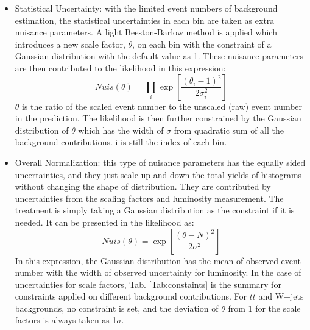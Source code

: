 \begin{itemize}
	\item Statistical Uncertainty: with the limited event numbers of background estimation, the statistical uncertainties in each bin are taken as extra nuisance parameters. A light Beeston-Barlow method is applied which introduces a new scale factor, $\theta$, on each bin with the constraint of a Gaussian distribution with the default value as 1. These nuisance parameters are then contributed to the likelihood in this expression:
	\begin{equation}
	Nuis(\theta) = \displaystyle\prod_{i}\exp{\left[\frac{(\theta_{i}-1)^2}{2\sigma^{2}_{i}}\right]}
	\end{equation} 
	$\theta$ is the ratio of the scaled event number to the unscaled (raw) event number in the prediction. The likelihood is then further constrained by the Gaussian distribution of $\theta$ which has the width of $\sigma$ from quadratic sum of all the background contributions. i is still the index of each bin.    
 
	\item Overall Normalization: this type of nuisance parameters has the equally sided uncertainties, and they just scale up and down the total yields of histograms without changing the shape of distribution. They are contributed by uncertainties from the scaling factors and luminosity measurement. The treatment is simply taking a Gaussian distribution as the constraint if it is needed. It can be presented in the likelihood as:
	\begin{equation}
	Nuis(\theta)=\exp\left[\frac{(\theta-N)^2}{2\sigma^2}\right]
	\end{equation}
	In this expression, the Gaussian distribution has the mean of observed event number with the width of observed uncertainty for luminosity. In the case of uncertainties for scale factors, Tab. \ref{Tab:constaints} is the summary for constraints applied on different background contributions.    For $t\bar{t}$ and W+jets backgrounds, no constraint is set, and the deviation of $\theta$ from 1 for the scale factors is always taken as 1$\sigma$.  
	

\end{itemize}
